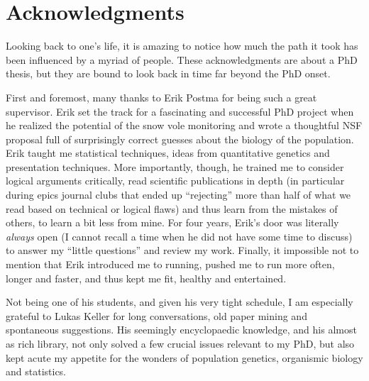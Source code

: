 
\chapter{Acknowledgments}

Looking back to one's life, it is amazing to notice how much the path it took has been influenced by a myriad of people. These acknowledgments are about a PhD thesis, but they are bound to look back in time far beyond the PhD onset.

First and foremost, many thanks to Erik Postma for being such a great supervisor. Erik set the track for a fascinating and successful PhD project when he realized the potential of the snow vole monitoring and wrote a thoughtful NSF proposal full of surprisingly correct guesses about the biology of the population. Erik taught me statistical techniques, ideas from quantitative genetics and presentation techniques. More importantly, though, he trained me to consider logical arguments critically, read scientific publications in depth (in particular during epics journal clubs that ended up ``rejecting'' more than half of what we read based on technical or logical flaws) and thus learn from the mistakes of others, to learn a bit less from mine. For four years, Erik's door was literally \emph{always} open (I cannot recall a time when he did not have some time to discuss) to answer my ``little questions'' and review my work.
Finally, it impossible not to mention that Erik introduced me to running, pushed me to run more often, longer and faster, and thus kept me fit, healthy and entertained.

Not being one of his students, and given his very tight schedule, I am especially grateful to Lukas Keller for long conversations, old paper mining and spontaneous suggestions. His seemingly encyclopaedic knowledge, and his almost as rich library, not only solved a few crucial issues relevant to my PhD, but also kept acute my appetite for the wonders of population genetics, organismic biology and statistics. 

